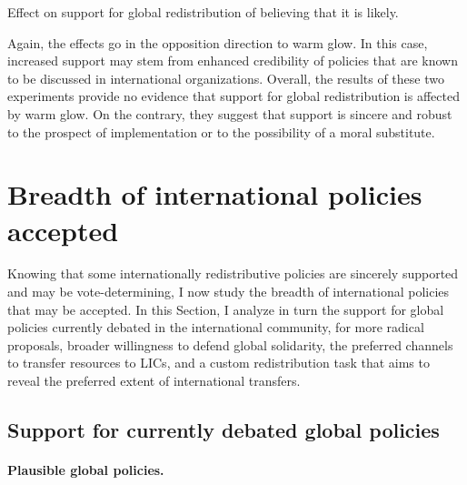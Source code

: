 \documentclass[12pt,english]{article}
\begin{document}
\begin{bibunit}
\begin{table}[!htbp] 
  \caption[Effect on support for global redistribution of believing that it is likely]{Effect on support for global redistribution of believing that it is likely.}\label{tab:iv} 
  \makebox[\textwidth][c]{}
\end{table}

Again, the effects go in the opposition direction to warm glow. In this case, increased support may stem from enhanced credibility of policies that are known to be discussed in international organizations. 
Overall, the results of these two experiments provide no evidence that support for global redistribution is affected by warm glow. On the contrary, they suggest that support is sincere and robust to the prospect of implementation or to the possibility of a moral substitute.


\section{Breadth of international policies accepted\label{sec:breadth}}

Knowing that some internationally redistributive policies are sincerely supported and may be vote-determining, I now study the breadth of international policies that may be accepted. In this Section, I analyze in turn the support for global policies currently debated in the international community, for more radical proposals, broader willingness to defend global solidarity, the preferred channels to transfer resources to LICs, and a custom redistribution task that aims to reveal the preferred extent of international transfers. 

\subsection{Support for currently debated global policies}\label{subsec:debated}

\paragraph{Plausible global policies.}


\end{bibunit}
\end{document}
